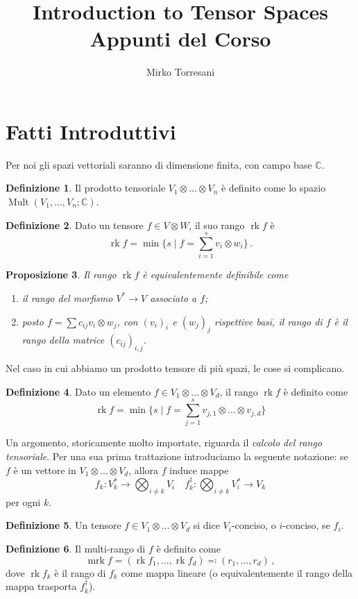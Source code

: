 \documentclass[a4paper, 11pt]{article}
\title{Introduction to Tensor Spaces\\ Appunti del Corso}
\author{Mirko Torresani}
\theoremstyle{definition}
\newtheorem{Def}{Definizione}[section]
\theoremstyle{plain}
\newtheorem{Prop}[Def]{Proposizione}
\newcommand{\C}{\mathbb{C}}
\DeclareMathOperator{\Mult}{Mult}
\DeclareMathOperator{\rk}{rk}
\DeclareMathOperator{\mrk}{mrk}
\begin{document}
	\maketitle
	\tableofcontents	
\section{Fatti Introduttivi}
Per noi gli spazi vettoriali saranno di dimensione finita, con campo base $\C$. 
\begin{Def}
	Il prodotto tensoriale $V_1 \otimes \dots \otimes V_n$ è definito come lo spazio $\Mult(V_1, \dots, V_n;\C)$.
\end{Def}

\begin{Def}
	Dato un tensore $f \in V \otimes W$, il suo rango $\rk f$ è 
	\[
		\rk f = \min\{s \mid f = \sum_{i = 1}^s v_i \otimes w_i\}\,.
	\]
\end{Def}
\begin{Prop}
	Il rango $\rk f$ è equivalentemente definibile come
	\begin{enumerate}
		\item il rango del morfismo $V^* \to V$ associato a $f$;
		\item posto $f = \sum c_{ij} v_i \otimes w_j$, con $(v_i)_i$ e $(w_j)_j$ rispettive basi, il rango di $f$ è il rango della matrice $(c_{ij})_{i,j}$.
	\end{enumerate}
\end{Prop}

Nel caso in cui abbiamo un prodotto tensore di più spazi, le cose si complicano.
\begin{Def}
	Dato un elemento $f \in V_1\otimes \dots\otimes V_d$, il rango $\rk f$ è definito come
	\[
		\rk f = \min\{s \mid f = \sum_{j = 1}^s v_{j,1} \otimes \dots \otimes  v_{j,d}\}
	\]
\end{Def}

Un argomento, storicamente molto importate, riguarda il \emph{calcolo del rango tensoriale}. Per una sua prima trattazione introduciamo la seguente notazione: se $f$ è un vettore in $V_1 \otimes \dots \otimes V_d$, allora $f$ induce mappe 
\[
	f_k \colon V_k^\ast \to \bigotimes_{i \neq k} V_i \quad f_k^\dagger \colon \bigotimes_{i \neq k} V_i^* \to V_k
\]
per ogni $k$.
\begin{Def}
	Un tensore $f \in V_1 \otimes \dots \otimes V_d$ si dice $V_i$-conciso, o $i$-conciso, se $f_i$.
\end{Def}
\begin{Def}
	Il multi-rango di $f$ è definito come
	\[
		\mrk f = (\rk f_1, \dots, \rk f_d) \eqqcolon (r_1, \dots, r_d) \,,
	\]
	dove $\rk f_k$ è il rango di $f_k$ come mappa lineare (o equivalentemente il rango della mappa trasporta $f_k^\dagger$).
\end{Def}
\end{document}
